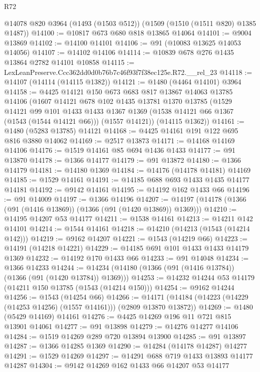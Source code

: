 \begin{lexlean}{R72}
\begin{coremodule}
    @14078
    @820
    @3964
    (@1493 (@1503 @512))
    (@1509 (@1510 (@1511 @820) @1385 @1487))
@14100 := @10817 @673 @680 @818 @13865 @14064
@14101 := @9004 @13869
@14102 := @14100 @14101
@14106 := @91 (@10083 @13625 @14053 @14056)
@14107 := @14102 @14106
@14114 := @10839 @678 @276 @1435 @13864 @2782 @14101 @10858
@14115 := LexLeanPreserve.Ccc362dd0d0b76b7c46f93f7f38ec125e.R72.__rel_23
@14118 := @14107 (@14114 (@14115 @1382))
@14121 := @1480 (@4464 @14101) @3964
@14158 := @4425
    @14121
    @150
    @673
    @683
    @817
    @13867
    @14063
    @13785
    @14106
    (@1607
      @14121
      @678
      @102
      @1435
      @13781
      @1370
      @13785
      (@1529
        @14121
        @99
        @101
        @1433
        @1433
        @1367
        @1369
        (@1538 @14121 @66 @1367 (@1543 (@1544 @14121 @66)))
        (@1557 @14121))
      (@14115 @1362))
@14161 := @1480 (@5283 @13785) @14121
@14168 := @4425 @14161 @191 @122 @695 @816 @3880 @14062
@14169 := @2517 @13873
@14171 := @14168 @14169 @14106
@14176 := @1519 @14161 @85 @694 @1436 @1433
@14177 := @91 @13870
@14178 := @1366 @14177
@14179 := @91 @13872
@14180 := @1366 @14179
@14181 := @14180 @1369
@14184 := @14176 (@14178 @14181) @14169
@14185 := @1529 @14161
@14191 := @14185 @688 @693 @1433 @1435 @14177 @14181
@14192 := @9142 @14161
@14195 := @14192 @162 @1433 @66
@14196 := @91 @14009
@14197 := @1366 @14196
@14207 := @14197 (@14178 (@1366 (@91 (@1416 @13869)) (@1366 (@91 (@1420 @13869)) @1369)))
@14210 := @14195 @14207 @53 @14177
@14211 := @1538 @14161
@14213 := @14211 @142 @14101
@14214 := @1544 @14161
@14218 := @14210 (@14213 (@1543 (@14214 @142)))
@14219 := @9162 @14207
@14221 := @1543 (@14219 @66)
@14223 := @14191 (@14218 @14221)
@14229 := @14185 @691 @101 @1433 @1433 @14179 @1369
@14232 := @14192 @170 @1433 @66
@14233 := @91 @14048
@14234 := @1366 @14233
@14244 := @14234 (@14180 (@1366 (@91 (@1416 @13784)) (@1366 (@91 (@1420 @13784)) @1369)))
@14253 := @14232 @14244 @53 @14179 (@14211 @150 @13785 (@1543 (@14214 @150)))
@14254 := @9162 @14244
@14256 := @1543 (@14254 @66)
@14266 := @14171 (@14184 (@14223 (@14229 (@14253 @14256) (@1557 @14161))) (@2809 @13870 @13872))
@14269 := @1480 (@5429 @14169) @14161
@14276 := @4425 @14269 @196 @11 @721 @815 @13901 @14061
@14277 := @91 @13898
@14279 := @14276 @14277 @14106
@14284 := @1519 @14269 @289 @720 @13894 @13900
@14285 := @91 @13897
@14287 := @1366 @14285 @1369
@14290 := @14284 (@14178 @14287) @14277
@14291 := @1529 @14269
@14297 := @14291 @688 @719 @1433 @13893 @14177 @14287
@14304 := @9142 @14269 @162 @1433 @66 @14207 @53 @14177

\end{coremodule}
\end{lexlean}
